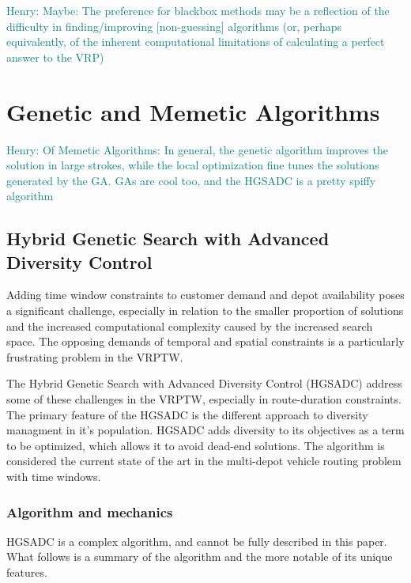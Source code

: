 \documentclass{sig-alternate}
\newcommand{\allcomments}[1]{{#1}}
\newcommand{\hfcomment}[1]{\textcolor{Teal}{\allcomments{Henry: {#1}}}}
\begin{document}
\hfcomment{Maybe: The preference for blackbox methods may be a reflection of the difficulty in finding/improving [non-guessing] algorithms (or, perhaps equivalently, of the inherent computational limitations of calculating a perfect answer to the VRP)}

\section{Genetic and Memetic Algorithms}
\hfcomment{Of Memetic Algorithms: In general, the genetic algorithm improves the solution in large strokes, while the local optimization fine tunes the solutions generated by the GA. GAs are cool too, and the HGSADC is a pretty spiffy algorithm}
\subsection{Hybrid Genetic Search with Advanced Diversity Control}
Adding time window constraints to customer demand and depot availability poses a significant challenge, especially in relation to the smaller proportion of solutions and the increased computational complexity caused by the increased search space. The opposing demands of temporal and spatial constraints is a particularly frustrating problem in the VRPTW.

The Hybrid Genetic Search with Advanced Diversity Control (HGSADC) address some of these challenges in the VRPTW, especially in route-duration constraints. The primary feature of the HGSADC is the different approach to diversity managment in it's population. HGSADC adds diversity to its objectives as a term to be optimized, which allows it to avoid dead-end solutions. The algorithm is considered the current state of the art in the multi-depot vehicle routing problem with time windows\cite{Vidal:2013}.

\subsubsection{Algorithm and mechanics}
HGSADC is a complex algorithm, and cannot be fully described in this paper. What follows is a summary of the algorithm and the more notable of its unique features.
\end{document}
